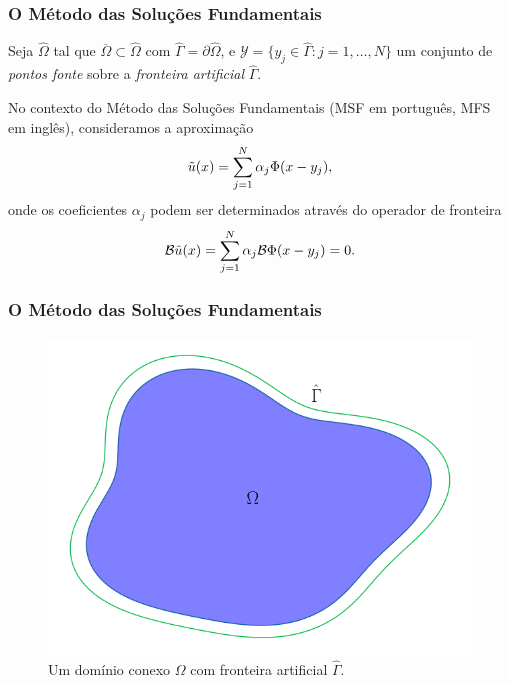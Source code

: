 \documentclass[portuguese,notheorems]{beamer}
\begin{document}
\begin{frame}\frametitle{O Método das Soluções Fundamentais}
    Seja \(\hat{\Omega}\) tal que \(\overline{\Omega} \subset \hat{\Omega}\) com \(\hat{\Gamma} = \partial\hat{\Omega}\), e \(\mathcal{Y} = \{y_j \in \hat{\Gamma}: j=1,\dots,N\}\) um conjunto de \textit{pontos fonte} sobre a \textit{fronteira artificial} \(\hat{\Gamma}\).
    \pause

    No contexto do Método das Soluções Fundamentais (MSF em português, MFS em inglês), consideramos a aproximação
    \begin{equation*}
        \Tilde{u}(x) = \sum_{j=1}^{N}\alpha_j \Phi(x-y_j),
    \end{equation*}
onde os coeficientes \(\alpha_j\) podem ser determinados através do operador de fronteira
        \[
            \mathcal{B}\Tilde{u}(x) = \sum_{j=1}^{N}\alpha_j \mathcal{B}\Phi(x-y_j) = 0.
        \]
\end{frame}

\begin{frame}\frametitle{O Método das Soluções Fundamentais}
    \begin{figure}
        \includegraphics[scale=0.5]{configuration_art_boundary.png}
        \caption{Um domínio conexo $\Omega$ com fronteira artificial \(\hat{\Gamma}\).}
    \end{figure}
\end{frame}
\end{document}
